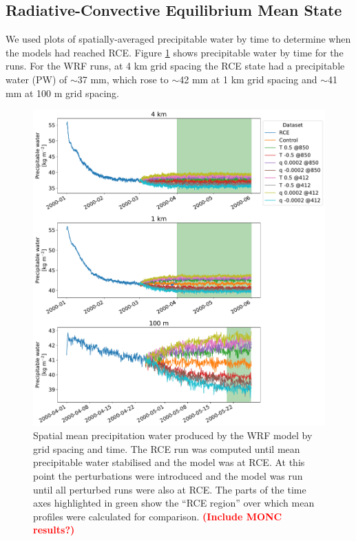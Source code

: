 \documentclass[draft]{agujournal2019}
\newcommand{\todo}[1]{\textcolor{red}{\textbf{(#1)}}}
\begin{document}
\subsection{Radiative-Convective Equilibrium Mean State}

We used plots of spatially-averaged precipitable water by time to determine when
the models had reached RCE. Figure \ref{fig:rce_pw} shows precipitable
water by time for the runs. For the WRF runs, at 4 km grid spacing the RCE state
had a precipitable water (PW) of $\sim$37 mm, which rose to $\sim$42 mm at 1 km
grid spacing and $\sim$41 mm at 100 m grid spacing.

\begin{figure}[pth]
    \noindent\includegraphics[width=\textwidth]{figures/RCE_PW} \caption{Spatial
    mean precipitation water produced by the WRF model by grid spacing and time.
    The RCE run was computed until mean precipitable water stabilised and the
    model was at RCE. At this point the perturbations were introduced and the
    model was run until all perturbed runs were also at RCE. The parts of the
    time axes highlighted in green show the ``RCE region'' over which mean
    profiles were calculated for comparison. \todo{Include MONC results?}}
    \label{fig:rce_pw}
\end{figure}
\end{document}

